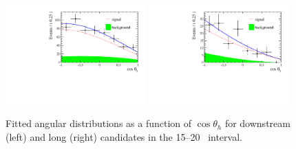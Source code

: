 %
\begin{figure}[h]
\centering
\includegraphics[width=0.48\textwidth]{Lmumu/figs/AngularDistribs/Fitted/AfbB_DD_q2_1500_2000.pdf}
\includegraphics[width=0.48\textwidth]{Lmumu/figs/AngularDistribs/Fitted/AfbB_LL_q2_1500_2000.pdf}
\caption{Fitted angular distributions as a function of $\cos\theta_h$ for downstream
 (left) and long (right) candidates in the 15--20 \gevgevcccc ~\qsq interval.  }
 \label{fig:AngFitB}
\end{figure}
%
